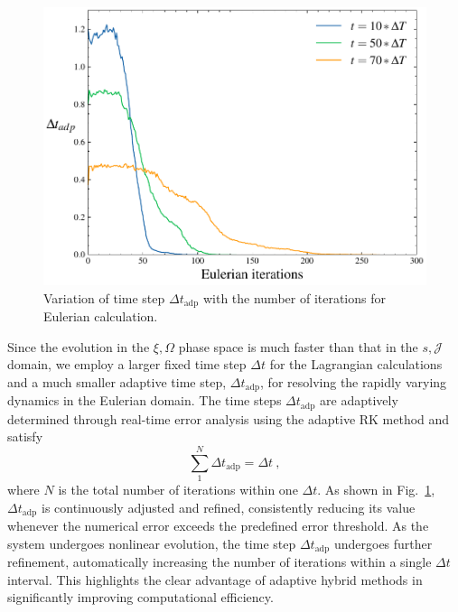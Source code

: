 \documentclass[times,12pt,3p,longtitle]{elsarticle}
\begin{document}
\begin{figure}[htbp]
    \centering
    \includegraphics[scale=0.5]{fig_dts1.pdf}
    \caption{Variation of time step $\Delta t_\mathrm{adp}$ with the number of iterations for Eulerian calculation.  
    }
    \label{fig.adapetive}
\end{figure}
Since the evolution in the $\xi,\Omega$  phase space 
is much 
faster 
than that in the $s,\mathcal{J}$ domain, we employ a larger fixed time step $\Delta t$ for the Lagrangian calculations 
and a much smaller adaptive time step, $\Delta t_\mathrm{adp}$, for resolving the rapidly varying dynamics in the Eulerian domain. The time steps $\Delta t_\mathrm{adp}$ are adaptively determined through real-time error analysis using the adaptive RK method and satisfy
\begin{equation}
    \sum_{1}^N \Delta t_\mathrm{adp} = \Delta t ~,
\end{equation}
where $N$ is the total number of iterations within one $\Delta t$. 
As shown in Fig.~\ref{fig.adapetive}, 
$\Delta t_\mathrm{adp}$ is continuously adjusted and refined, consistently reducing its value whenever the numerical error exceeds the predefined error threshold. As the system undergoes nonlinear evolution, the time step $\Delta t_\mathrm{adp}$ undergoes further refinement, automatically increasing the number of iterations within a single $\Delta t$ interval. This highlights the clear advantage of adaptive hybrid methods in significantly improving computational efficiency.
\end{document}
